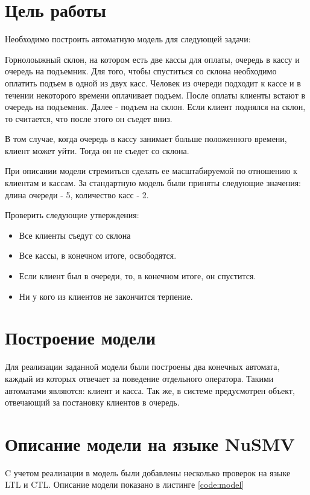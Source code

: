 







\section{Цель работы}
Необходимо построить автоматную модель для следующей задачи:

Горнолоыжный склон, на котором есть две кассы для оплаты, очередь в кассу и очередь на подъемник. Для того, чтобы спуститься со склона необходимо оплатить подъем в одной из двух касс. Человек из очереди подходит к кассе и в течении некоторого времени оплачивает подъем. После оплаты клиенты встают в очередь на подъемник. Далее - подъем на склон. Если клиент поднялся на склон, то считается, что после этого он съедет вниз.

В том случае, когда очередь в кассу занимает больше положенного времени, клиент может уйти. Тогда он не съедет со склона. 

При описании модели стремиться сделать ее масштабируемой по отношению к клиентам и кассам. За стандартную модель были приняты следующие значения: длина очереди - 5, количество касс - 2. 

Проверить следующие утверждения:
\begin{itemize}
\item Все клиенты съедут со склона
\item Все кассы, в конечном итоге, освободятся.
\item Если клиент был в очереди, то, в конечном итоге, он спустится.
\item Ни у кого из клиентов не закончится терпение.
\end{itemize}

\section{Построение модели}
Для реализации заданной модели были построены два конечных автомата, каждый из которых отвечает за поведение отдельного оператора. Такими автоматами являются: клиент и касса. Так же, в системе предусмотрен объект, отвечающий за постановку клиентов в очередь. 


\section{Описание модели на языке NuSMV}
C учетом реализации в модель были добавлены несколько проверок на языке LTL и CTL. Описание модели показано в листинге \ref{code:model}

